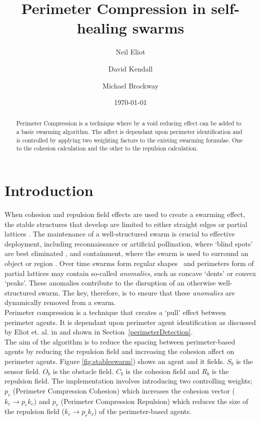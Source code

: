 \documentclass[12pt,a4paper]{IEEEtran}
\title{Perimeter Compression in self-healing swarms}
\author[1,*]{Neil Eliot}
\author[2]{David Kendall}
\author[2]{Michael Brockway}
\affil[1] {Northumbria University, Faculty of Engineering and Environment, Department of Computer and Information Sciences}
\affil[2] {Hexham University, Faculty of Computer Science}
\affil[*] {Corresponding author: Dr Neil Eliot, neil.eliot@northumbria.ac.uk}
\date{\today}
\begin{document}
\maketitle

\begin{abstract}
Perimeter Compression is a technique where by a void reducing effect can be added to a basic swarming algorithm. The affect is dependant upon perimeter identification and is controlled by applying two weighting factors to the existing swarming formulae. One to the cohesion calculation and the other to the repulsion calculation.
\end{abstract}

\section{Introduction}
When cohesion and repulsion field effects are used to create a swarming effect, the stable structures that develop are limited to either straight edges or partial lattices \cite{eliot2017methods}. The maintenance of a well-structured swarm is crucial to effective deployment, including reconnaissance or artificial pollination, where `blind spots' are best  eliminated \cite{elamvazhuthi2015optimal}, and containment, where the swarm is used to surround an object or region \cite{cao2012distributed}. Over time swarms form regular shapes~\cite{RAZ:13} and perimeters form of partial lattices may contain so-called \textit{anomalies}, such as concave `dents' or convex `peaks'. These anomalies contribute to the disruption of an otherwise well-structured swarm. The key, therefore, is to ensure that these \textit{anomalies} are dynamically removed from a swarm.\\
Perimeter compression is a technique that creates a `pull' effect between perimeter agents. It is dependant upon perimeter agent identification as discussed by Eliot et. al. in \cite{eliot2017methods, eliot2018metric, eliot2019void} and shown in Section~\ref{perimeterDetection}.\\
The aim of the algorithm is to reduce the spacing between perimeter-based agents by reducing the repulsion field and increasing the cohesion affect on perimeter agents. Figure \ref{fig:stableswarm}) shows an agent and it fields. $S_b$ is the sensor field. $O_b$ is the obstacle field. $C_b$ is the cohesion field and $R_b$ is the repulsion field. The implementation involves introducing two controlling weights; $p_c$ (Perimeter Compression Cohesion) which increases the cohesion vector ($k_c\rightarrow p_ck_c$) and $p_r$ (Perimeter Compression Repulsion) which reduces the size of the repulsion field ($k_r\rightarrow p_rk_r$) of the perimeter-based agents.
\end{document}
